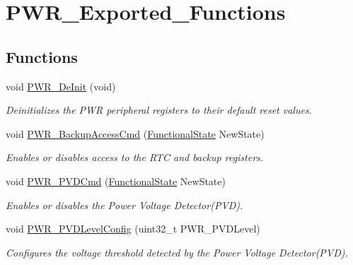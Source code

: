 \hypertarget{group___p_w_r___exported___functions}{}\section{P\+W\+R\+\_\+\+Exported\+\_\+\+Functions}
\label{group___p_w_r___exported___functions}
\subsection*{Functions}
\begin{DoxyCompactItemize}
\item 
void \mbox{\hyperlink{group___p_w_r___exported___functions_gad03a0aac7bc3bc3a9fd012f3769a6990}{P\+W\+R\+\_\+\+De\+Init}} (void)
\begin{DoxyCompactList}\small\item\em Deinitializes the P\+WR peripheral registers to their default reset values. \end{DoxyCompactList}\item 
void \mbox{\hyperlink{group___p_w_r___exported___functions_ga0741aea35572b1a75f82b74de12df800}{P\+W\+R\+\_\+\+Backup\+Access\+Cmd}} (\mbox{\hyperlink{group___exported__types_gac9a7e9a35d2513ec15c3b537aaa4fba1}{Functional\+State}} New\+State)
\begin{DoxyCompactList}\small\item\em Enables or disables access to the R\+TC and backup registers. \end{DoxyCompactList}\item 
void \mbox{\hyperlink{group___p_w_r___exported___functions_ga42cad476b816e0a33594a933b3ed1acd}{P\+W\+R\+\_\+\+P\+V\+D\+Cmd}} (\mbox{\hyperlink{group___exported__types_gac9a7e9a35d2513ec15c3b537aaa4fba1}{Functional\+State}} New\+State)
\begin{DoxyCompactList}\small\item\em Enables or disables the Power Voltage Detector(\+P\+V\+D). \end{DoxyCompactList}\item 
void \mbox{\hyperlink{group___p_w_r___exported___functions_ga237c143ef6aa55abb8049fa7bf24ab8f}{P\+W\+R\+\_\+\+P\+V\+D\+Level\+Config}} (uint32\+\_\+t P\+W\+R\+\_\+\+P\+V\+D\+Level)
\begin{DoxyCompactList}\small\item\em Configures the voltage threshold detected by the Power Voltage Detector(\+P\+V\+D). \end{DoxyCompactList}\item 

\end{DoxyCompactItemize}

